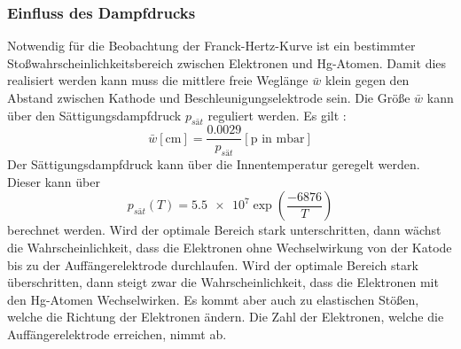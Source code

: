 \subsubsection{Einfluss des Dampfdrucks}
Notwendig für die Beobachtung der Franck-Hertz-Kurve ist ein bestimmter Stoßwahrscheinlichkeitsbereich zwischen Elektronen und Hg-Atomen.
Damit dies realisiert werden kann muss die mittlere freie Weglänge $\bar{w}$ klein gegen den Abstand zwischen Kathode und Beschleunigungselektrode sein.
Die Größe $\bar{w}$ kann über den Sättigungsdampfdruck $p_{sät}$ reguliert werden.
Es gilt :
\begin{equation}
  \label{eq:laeng}
  \bar{w}[\si{\centi\meter}] =\frac{0.0029}{p_{sät}}[\text{p in } \si{\milli\bar}]
\end{equation}
Der Sättigungsdampfdruck kann über die Innentemperatur geregelt werden.
Dieser kann über
\begin{equation}
  \label{eq:druck}
  p_{sät}(T) = 5.5\num{e7} \exp\left(\frac{-6876}{T}\right)
\end{equation}
berechnet werden.
Wird der optimale Bereich stark unterschritten, dann wächst die Wahrscheinlichkeit, dass die Elektronen ohne Wechselwirkung von der Katode bis zu der Auffängerelektrode durchlaufen.
Wird der optimale Bereich stark überschritten, dann steigt zwar die Wahrscheinlichkeit, dass die Elektronen mit den Hg-Atomen Wechselwirken.
Es kommt aber auch zu elastischen Stößen, welche die Richtung der Elektronen ändern.
Die Zahl der Elektronen, welche die Auffängerelektrode erreichen, nimmt ab.
